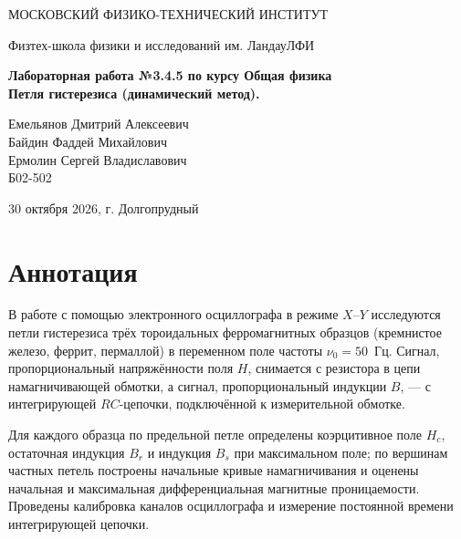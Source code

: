 \documentclass[a4paper,12pt]{article}
\begin{document}
\begin{titlepage}
\begin{center}
    {\large МОСКОВСКИЙ ФИЗИКО-ТЕХНИЧЕСКИЙ ИНСТИТУТ}
\end{center}
\begin{center}
    {\large Физтех-школа физики и исследований им. Ландау\break ЛФИ}
\end{center}

    \vspace{3cm}

\vspace{0.15cm}
{
\begin{center}
    \huge \bf Лабораторная работа №3.4.5 по курсу Общая физика\\
    \vspace{0.4cm}
    \LARGE Петля гистерезиса (динамический метод).
\end{center}
}
\vspace{1.5cm}
\begin{flushright}
Емельянов Дмитрий Алексеевич\\
Байдин Фаддей Михайлович\\
Ермолин Сергей Владиславович\\
\vspace{0.4cm}
Б02-502
\end{flushright}
\vspace{9cm}
\begin{center}
    \large 30 октября 2026, г. Долгопрудный
\end{center}
\end{titlepage}

\section{Аннотация}
В работе с помощью электронного осциллографа в режиме $X$--$Y$ исследуются
петли гистерезиса трёх тороидальных ферромагнитных образцов (кремнистое
железо, феррит, пермаллой) в переменном поле частоты $\nu_0 = 50$~Гц.
Сигнал, пропорциональный напряжённости поля $H$, снимается с резистора в
цепи намагничивающей обмотки, а сигнал, пропорциональный индукции $B$, ---
с интегрирующей $RC$-цепочки, подключённой к измерительной обмотке.

Для каждого образца по предельной петле определены коэрцитивное поле
$H_c$, остаточная индукция $B_r$ и индукция $B_s$ при максимальном поле;
по вершинам частных петель построены начальные кривые намагничивания и
оценены начальная и максимальная дифференциальная магнитные
проницаемости. Проведены калибровка каналов осциллографа и измерение
постоянной времени интегрирующей цепочки.
\end{document}
